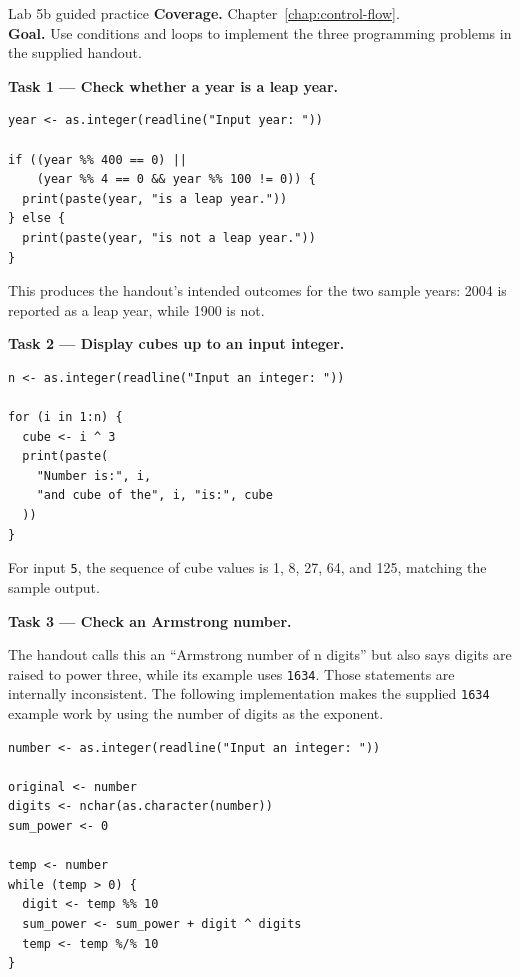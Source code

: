
\begin{labproject}{Lab 5b guided practice}
\textbf{Coverage.} Chapter~\ref{chap:control-flow}.\\
\textbf{Goal.} Use conditions and loops to implement the three programming problems in the supplied handout.

\textbf{Task 1 --- Check whether a year is a leap year.}

\begin{lstlisting}[style=dsr]
year <- as.integer(readline("Input year: "))

if ((year %% 400 == 0) ||
    (year %% 4 == 0 && year %% 100 != 0)) {
  print(paste(year, "is a leap year."))
} else {
  print(paste(year, "is not a leap year."))
}
\end{lstlisting}

This produces the handout's intended outcomes for the two sample years: 2004 is reported as a leap year, while 1900 is not.

\textbf{Task 2 --- Display cubes up to an input integer.}

\begin{lstlisting}[style=dsr]
n <- as.integer(readline("Input an integer: "))

for (i in 1:n) {
  cube <- i ^ 3
  print(paste(
    "Number is:", i,
    "and cube of the", i, "is:", cube
  ))
}
\end{lstlisting}

For input \texttt{5}, the sequence of cube values is 1, 8, 27, 64, and 125, matching the sample output.

\textbf{Task 3 --- Check an Armstrong number.}

The handout calls this an ``Armstrong number of n digits'' but also says digits are raised to power three, while its example uses \texttt{1634}. Those statements are internally inconsistent. The following implementation makes the supplied \texttt{1634} example work by using the number of digits as the exponent.

\begin{lstlisting}[style=dsr]
number <- as.integer(readline("Input an integer: "))

original <- number
digits <- nchar(as.character(number))
sum_power <- 0

temp <- number
while (temp > 0) {
  digit <- temp %% 10
  sum_power <- sum_power + digit ^ digits
  temp <- temp %/% 10
}


\end{lstlisting}
\end{labproject}
